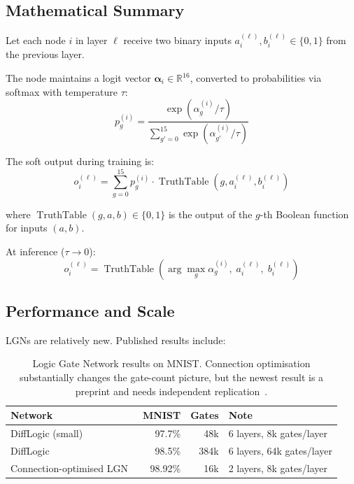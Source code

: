 \subsection{Mathematical Summary}
\label{sec:lgn-math}

Let each node $i$ in layer $\ell$ receive two binary inputs
$a_i^{(\ell)}, b_i^{(\ell)} \in \{0, 1\}$ from the previous layer.

The node maintains a logit vector $\bm{\alpha}_i \in \mathbb{R}^{16}$,
converted to probabilities via softmax with temperature $\tau$:
\begin{equation}
  p_g^{(i)} = \frac{\exp(\alpha_g^{(i)} / \tau)}
    {\sum_{g'=0}^{15} \exp(\alpha_{g'}^{(i)} / \tau)}
  \label{eq:lgn-softmax}
\end{equation}

The soft output during training is:
\begin{equation}
  o_i^{(\ell)} = \sum_{g=0}^{15} p_g^{(i)} \cdot
    \operatorname{TruthTable}(g, a_i^{(\ell)}, b_i^{(\ell)})
  \label{eq:lgn-soft-output}
\end{equation}

where $\operatorname{TruthTable}(g, a, b) \in \{0, 1\}$ is the output
of the $g$-th Boolean function for inputs $(a, b)$.

At inference ($\tau \to 0$):
\begin{equation}
  o_i^{(\ell)} = \operatorname{TruthTable}\!\left(
    \arg\max_g \alpha_g^{(i)},\; a_i^{(\ell)},\; b_i^{(\ell)}\right)
  \label{eq:lgn-hard-output}
\end{equation}

\subsection{Performance and Scale}

LGNs are relatively new. Published results include:

\begin{table}[htbp]
\centering
\caption{Logic Gate Network results on MNIST. Connection optimisation
  substantially changes the gate-count picture, but the newest result is a
  preprint and needs independent replication~\cite{petersen2022difflogic,mommen2026fullytrainable}.}
\label{tab:lgn-perf}
\begin{tabular}{@{}lrrl@{}}
  \toprule
  \textbf{Network} & \textbf{MNIST} & \textbf{Gates} & \textbf{Note} \\
  \midrule
  DiffLogic (small)~\cite{petersen2022difflogic} & 97.7\% & 48k  & 6 layers, 8k gates/layer \\
  DiffLogic~\cite{petersen2022difflogic}          & 98.5\% & 384k & 6 layers, 64k gates/layer \\
  Connection-optimised LGN~\cite{mommen2026fullytrainable} & 98.92\% & 16k & 2 layers, 8k gates/layer \\
  \bottomrule
\end{tabular}
\end{table}

